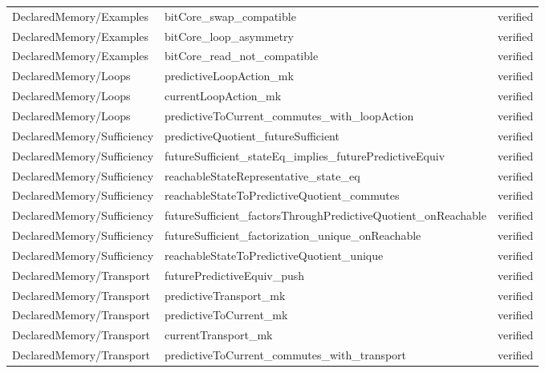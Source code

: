 \begin{longtable}{>{\raggedright\arraybackslash}p{3.6cm}>{\raggedright\arraybackslash}p{8.4cm}p{2.9cm}}
DeclaredMemory/\allowbreak{}Examples & bitCore\_\allowbreak{}swap\_\allowbreak{}compatible & verified \\
DeclaredMemory/\allowbreak{}Examples & bitCore\_\allowbreak{}loop\_\allowbreak{}asymmetry & verified \\
DeclaredMemory/\allowbreak{}Examples & bitCore\_\allowbreak{}read\_\allowbreak{}not\_\allowbreak{}compatible & verified \\
DeclaredMemory/\allowbreak{}Loops & predictiveLoopAction\_\allowbreak{}mk & verified \\
DeclaredMemory/\allowbreak{}Loops & currentLoopAction\_\allowbreak{}mk & verified \\
DeclaredMemory/\allowbreak{}Loops & predictiveToCurrent\_\allowbreak{}commutes\_\allowbreak{}with\_\allowbreak{}loopAction & verified \\
DeclaredMemory/\allowbreak{}Sufficiency & predictiveQuotient\_\allowbreak{}futureSufficient & verified \\
DeclaredMemory/\allowbreak{}Sufficiency & futureSufficient\_\allowbreak{}stateEq\_\allowbreak{}implies\_\allowbreak{}futurePredictiveEquiv & verified \\
DeclaredMemory/\allowbreak{}Sufficiency & reachableStateRepresentative\_\allowbreak{}state\_\allowbreak{}eq & verified \\
DeclaredMemory/\allowbreak{}Sufficiency & reachableStateToPredictiveQuotient\_\allowbreak{}commutes & verified \\
DeclaredMemory/\allowbreak{}Sufficiency & futureSufficient\_\allowbreak{}factorsThroughPredictiveQuotient\_\allowbreak{}onReachable & verified \\
DeclaredMemory/\allowbreak{}Sufficiency & futureSufficient\_\allowbreak{}factorization\_\allowbreak{}unique\_\allowbreak{}onReachable & verified \\
DeclaredMemory/\allowbreak{}Sufficiency & reachableStateToPredictiveQuotient\_\allowbreak{}unique & verified \\
DeclaredMemory/\allowbreak{}Transport & futurePredictiveEquiv\_\allowbreak{}push & verified \\
DeclaredMemory/\allowbreak{}Transport & predictiveTransport\_\allowbreak{}mk & verified \\
DeclaredMemory/\allowbreak{}Transport & predictiveToCurrent\_\allowbreak{}mk & verified \\
DeclaredMemory/\allowbreak{}Transport & currentTransport\_\allowbreak{}mk & verified \\
DeclaredMemory/\allowbreak{}Transport & predictiveToCurrent\_\allowbreak{}commutes\_\allowbreak{}with\_\allowbreak{}transport & verified \\

\end{longtable}
